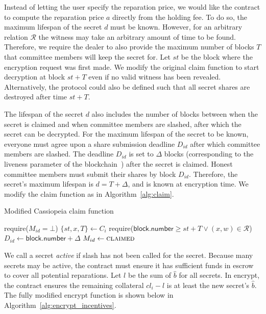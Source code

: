 Instead of letting the user specify the reparation price, we would like the contract to compute the reparation price $a$ directly from the holding fee.
To do so, the maximum lifespan of the secret $d$ must be known.
However, for an arbitrary relation $\mathcal{R}$ the witness may take an arbitrary amount of time to be found.
Therefore, we require the dealer to also provide the maximum number of blocks $T$ that committee members will keep the secret for.
Let $st$ be the block where the encryption request was first made.
We modify the original \textsf{claim} function to start decryption at block $st + T$ even if no valid witness has been revealed.
Alternatively, the protocol could also be defined such that all secret shares are destroyed after time $st + T$.

The lifespan of the secret $d$ also includes the number of blocks between when the secret is claimed and when committee members are slashed, after which the secret can be decrypted.
For the maximum lifespan of the secret to be known, everyone must agree upon a share submission deadline $D_{id}$ after which committee members are slashed.
The deadline $D_{id}$ is set to $\Delta$ blocks (corresponding to the liveness parameter of the blockchain~\cite{backbone}) after the secret is claimed.
Honest committee members must submit their shares by block $D_{id}$.
Therefore, the secret's maximum lifespan is $d = T + \Delta$, and is known at encryption time.
We modify the \textsf{claim} function as in Algorithm~\ref{alg:claim}.

\begin{algorithm}[h]
\caption{Modified Cassiopeia \textsf{claim} function}
\label{alg:claim}
    \begin{algorithmic}[1]
                \State require($M_{id} = \bot$)
                \State $\{st, x, T\} \gets C_i$
                \State require($\textsf{block.number} \geq st + T \lor (x, w) \in \mathcal{R}$)
                \State $D_{id} \gets \textsf{block.number} + \Delta$
                \State $M_{id} \gets \textsc{claimed}$
            \EndFunction
    \end{algorithmic}
\end{algorithm}

We call a secret \emph{active} if \textsf{slash} has not been called for the secret.
Because many secrets may be active, the contract must ensure it has sufficient funds in escrow to cover all potential reparations.
Let $l$ be the sum of $\hat{b}$ for all secrets.
In {\sf encrypt}, the contract ensures the remaining collateral $cl_i - l$ is at least the new secret's $\hat{b}$.
The fully modified \textsf{encrypt} function is shown below in Algorithm~\ref{alg:encrypt_incentives}.

